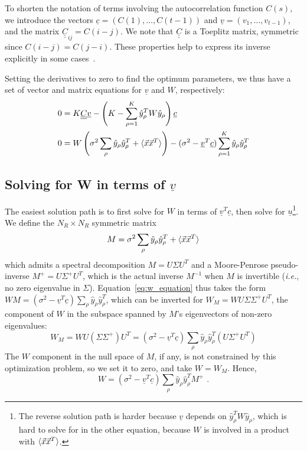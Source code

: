 \documentclass[letter, 12pt]{article}
\def\beq{ \begin{equation} }		%
\def\eeq{ \end{equation} } 			%
\def\ie{\textit{i.e.}, }
\newcommand{\dul}[1]{\underline{\underline{#1}}}
\begin{document}
To shorten the notation of terms involving the autocorrelation function $C(s)$, we introduce the vectors $\underline{c} = (C(1), \ldots, C(t-1))$ and $\underline{v} = (v_1, \ldots, v_{t-1})$, and the matrix $\dul{C}_{ij} = C(i-j)$. We note that $\dul{C}$ is a Toeplitz matrix, symmetric since $C(i-j) = C(j-i)$. These properties help to express its inverse explicitly in some cases~\cite{dow_explicit_2003}. 

Setting the derivatives to zero to find the optimum parameters, we thus have a set of vector and matrix equations for $\underline{v}$ and $W$, respectively:
\begin{align}
0 &= K \dul{C} \underline{v} - \left(K - \sum_{\rho=1}^K \hat{y}_{\rho}^T W \hat{y}_{\rho}\right) \underline{c}
	 \label{eq:v_equation} \\
0 &= W \left( \sigma^2 \sum_{\rho} \hat{y}_{\rho} \hat{y}_{\rho}^T + \braket{\vec{x} \vec{x}^T} \right) - (\sigma^2 - \underline{v}^T \underline{c}) \sum_{\rho=1}^K \hat{y}_{\rho} \hat{y}_{\rho}^T
	\label{eq:w_equation}
\end{align}

\subsection{Solving for W in terms of $\underline{v}$}
The easiest solution path is to first solve for $W$ in terms of $\underline{v}^T \underline{c}$, then solve for $\underline{u}${\protect\footnote{
The reverse solution path is harder because $\underline{v}$ depends on $\hat{y}_{\rho}^T W \hat{y}_{\rho}$, which is hard to solve for in the other equation, because $W$ is involved in a product with $\braket{\vec{x} \vec{x}^T}$. 
}}. We define the $N_R \times N_R$ symmetric matrix
\beq
M = \sigma^2 \sum_{\rho} \hat{y}_{\rho} \hat{y}_{\rho}^T + \braket{\vec{x} \vec{x}^T}
\label{eq:matrix_m}
\eeq
which admits a spectral decomposition $M = U \Sigma U^T$ and a Moore-Penrose pseudo-inverse $M^+ = U \Sigma^+ U^T$, which is the actual inverse $M^{-1}$ when $M$ is invertible (\ie no zero eigenvalue in $\Sigma$). Equation~\ref{eq:w_equation} thus takes the form $WM = (\sigma^2 - \underline{v}^T\underline{c}) \sum_{\rho} \hat{y}_{\rho} \hat{y}_{\rho}^T$, which can be inverted for $W_M = W U \Sigma \Sigma^+ U^T$, the component of $W$ in the subspace spanned by $M$'s eigenvectors of non-zero eigenvalues:
\begin{equation*}
W_M  = W U (\Sigma \Sigma^+) U^T = (\sigma^2 - \underline{v}^T \underline{c}) \sum_{\rho} \hat{y}_{\rho} \hat{y}_{\rho}^T (U \Sigma^+ U^T) 
\end{equation*}
The $W$ component in the null space of $M$, if any, is not constrained by this optimization problem, so we set it to zero, and take $W = W_M$. Hence, 
\beq
	W = (\sigma^2 - \underline{v}^T \underline{c}) \sum_{\rho} \hat{y}_{\rho} \hat{y}_{\rho}^T M^+ \,\, .
	\label{eq:w_in_terms_v}
\eeq
\end{document}
